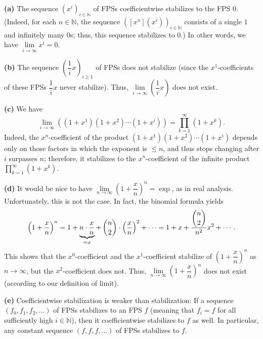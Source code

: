 \begin{example}
\textbf{(a)} The sequence $\left(  x^{i}\right)  _{i\in\mathbb{N}}$ of FPSs
coefficientwise stabilizes to the FPS $0$. (Indeed, for each $n\in\mathbb{N}$,
the sequence $\left(  \left[  x^{n}\right]  \left(  x^{i}\right)  \right)
_{i\in\mathbb{N}}$ consists of a single $1$ and infinitely many $0$s; thus,
this sequence stabilizes to $0$.) In other words, we have $\lim
\limits_{i\rightarrow\infty}x^{i}=0$. \medskip

\textbf{(b)} The sequence $\left(  \dfrac{1}{i}x\right)  _{i\geq1}$ of FPSs
does not stabilize (since the $x^{1}$-coefficients of these FPSs $\dfrac{1}%
{i}x$ never stabilize). Thus, $\lim\limits_{i\rightarrow\infty}\left(
\dfrac{1}{i}x\right)  $ does not exist. \medskip

\textbf{(c)} We have%
\[
\lim\limits_{i\rightarrow\infty}\left(  \left(  1+x^{1}\right)  \left(
1+x^{2}\right)  \cdots\left(  1+x^{i}\right)  \right)  =\prod_{k=1}^{\infty
}\left(  1+x^{k}\right)  .
\]
Indeed, the $x^{n}$-coefficient of the product $\left(  1+x^{1}\right)
\left(  1+x^{2}\right)  \cdots\left(  1+x^{i}\right)  $ depends only on those
factors in which the exponent is $\leq n$, and thus stops changing after $i$
surpasses $n$; therefore, it stabilizes to the $x^{n}$-coefficient of the
infinite product $\prod_{k=1}^{\infty}\left(  1+x^{k}\right)  $. \medskip

\textbf{(d)} It would be nice to have $\lim\limits_{n\rightarrow\infty}\left(
1+\dfrac{x}{n}\right)  ^{n}=\exp$, as in real analysis. Unfortunately, this is
not the case. In fact, the binomial formula yields
\[
\left(  1+\dfrac{x}{n}\right)  ^{n}=1+\underbrace{n\cdot\dfrac{x}{n}}%
_{=x}+\,\dbinom{n}{2}\cdot\left(  \dfrac{x}{n}\right)  ^{2}+\cdots
=1+x+\dfrac{\dbinom{n}{2}}{n^{2}}x^{2}+\cdots.
\]
This shows that the $x^{0}$-coefficient and the $x^{1}$-coefficient stabilize
of $\left(  1+\dfrac{x}{n}\right)  ^{n}$ as $n\rightarrow\infty$, but the
$x^{2}$-coefficient does not. Thus, $\lim\limits_{n\rightarrow\infty}\left(
1+\dfrac{x}{n}\right)  ^{n}$ does not exist (according to our definition of
limit). \medskip

\textbf{(e)} Coefficientwise stabilization is weaker than stabilization: If a
sequence $\left(  f_{0},f_{1},f_{2},\ldots\right)  $ of FPSs stabilizes to an
FPS $f$ (meaning that $f_{i}=f$ for all sufficiently high $i\in\mathbb{N}$),
then it coefficientwise stabilizes to $f$ as well. In particular, any constant
sequence $\left(  f,f,f,\ldots\right)  $ of FPSs stabilizes to $f$.
\end{example}

